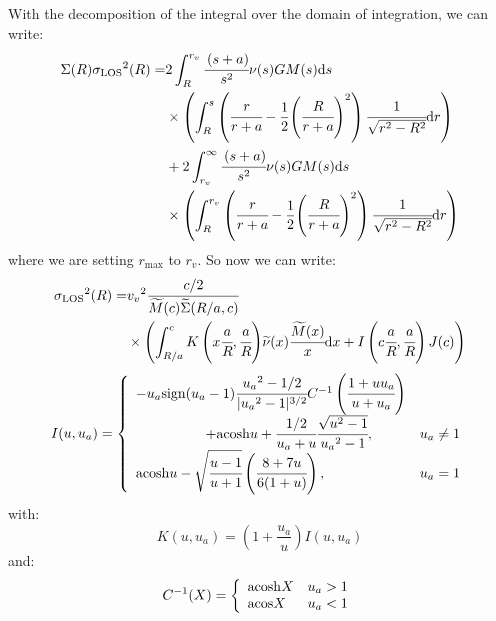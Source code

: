 With the decomposition of the integral over the domain of integration, we can
write:
%
\begin{align}
    \Sigma{(R)}{\sigma_\mathrm{LOS}}^2{(R)}=&
        2\int_R^{r_v}{\cfrac{\left({s+a}\right)}{s^2}{\nu(s)}{G}{M(s)}}{{\rm{d}}{s}}
        \nonumber\\
    &\times
        \left(\int_R^s{\left(\cfrac{r}{r+a}-\frac{1}{2}
        {\left(\cfrac{R}{r+a}\right)}^2\right)
        \cfrac{1}{\sqrt{r^2-R^2}}{\rm{d}}{r}}\right)\nonumber\\
    &+2\int_{r_v}^{\infty}
        \cfrac{\left({s+a}\right)}{s^2}\nu(s){G}{M(s)}{\rm{d}}{s}\nonumber\\
    &\times
        \left(\int_R^{r_v}
            \left(\cfrac{r}{r+a}-\frac{1}{2}{\left(\cfrac{R}{r+a}\right)}^2\right)
            \cfrac{1}{\sqrt{r^2-R^2}}{\rm{d}}{r}\right)
\end{align}
%
where we are setting $r_{\max}$ to $r_v$. So now we can write:
%
\begin{align}
    {\sigma_\mathrm{LOS}}^2{(R)}=&{v_v}^2\cfrac{c/2}{\widetilde{M}{(c)}\widetilde{\Sigma}{(R/a,c)}}\nonumber\\
    &\times\left(\int_{R/a}^c{{K}\left({x\cfrac{a}{R},\cfrac{a}{R}}\right)}\widetilde{\nu}{(x)}
    \cfrac{\widetilde{M}{(x)}}{x}{\rm{d}}{x}+I\left({c\cfrac{a}{R},\cfrac{a}{R}}\right){J(c)}\right)
\end{align}
%
\begin{equation}
    I(u,u_a)=\left\{\begin{array}{lr}
        -u_a{\rm{sign}}(u_a-1)\cfrac{{u_a}^2-1/2}{|{u_a}^2-1|^{3/2}}{C^{-1}\left(\cfrac{1+u{u_a}}{u+u_a}\right)}&\\
        \hspace{5em}+{\rm{acosh}}{u}+\cfrac{1/2}{u_a+u}\cfrac{\sqrt{u^2-1}}{{u_a}^2-1},&{u_a}\neq1\\
        {\rm{acosh}}{u}-\sqrt{\cfrac{u-1}{u+1}}\left(\cfrac{8+7u}{6(1+u)}\right),&{u_a}=1\\
    \end{array}\right.
\end{equation}
%
with:
%
\begin{equation}
    K(u,u_a)=\left({1+\frac{u_a}{u}}\right){I(u,u_a)}
\end{equation}
%
and:
%
\begin{equation}
    C^{-1}(X)=\left\{\begin{array}{lr}
        {\rm{acosh}}{X}&u_a>1\\
        {\rm{acos}}{X}&u_a<1\\
    \end{array}\right.
\end{equation}
